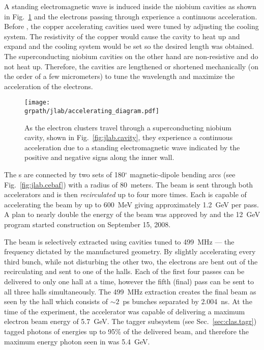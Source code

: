 A standing electromagnetic wave is induced inside the niobium cavities as shown in Fig.~\ref{fig:jlab.accel} and the electrons passing through experience a continuous acceleration. Before , the copper accelerating cavities used were tuned by adjusting the cooling system. The resistivity of the copper would cause the cavity to heat up and expand and the cooling system would be set so the desired length was obtained. The superconducting niobium cavities on the other hand are non-resistive and do not heat up. Therefore, the cavities are lengthened or shortened mechanically (on the order of a few micrometers) to tune the wavelength and maximize the acceleration of the electrons.

\begin{figure}\begin{center}
\texttt{[image: \\grpath/jlab/accelerating\_diagram.pdf]}
\caption[Accelerating Cavity Diagram]{\label{fig:jlab.accel}As the electron clusters travel through a superconducting niobium cavity, shown in Fig.~\ref{fig:jlab.cavity}, they experience a continuous acceleration due to a standing electromagnetic wave indicated by the positive and negative signs along the inner wall.}
\end{center}\end{figure}

The s are connected by two sets of 180$^\circ$ magnetic-dipole bending arcs (see Fig.~\ref{fig:jlab.cebaf}) with a radius of 80~meters. The beam is sent through both accelerators and is then \emph{recirculated} up to four more times. Each  is capable of accelerating the beam by up to 600~MeV giving approximately 1.2~GeV per pass. A plan to nearly double the energy of the beam was approved by \label{abbr:doe} and the 12~GeV program started construction on September 15, 2008\cite{jlab.news.cd3, jlab.12gev.starts}.

The beam is selectively extracted using  cavities tuned to 499~MHz --- the frequency dictated by the manufactured geometry. By slightly accelerating every third bunch, while not disturbing the other two, the electrons are bent out of the recirculating  and sent to one of the halls. Each of the first four passes can be delivered to only one hall at a time, however the fifth (final) pass can be sent to all three halls simultaneously. The 499~MHz extraction creates the final beam as seen by the hall which consists of $\sim2$~ps bunches separated by 2.004~ns. At the time of the  experiment, the accelerator was capable of delivering a maximum electron beam energy of 5.7~GeV. The tagger subsystem (see Sec.~\ref{sec:clas.tagr}) tagged photons of energies up to 95\% of the delivered beam, and therefore the maximum energy photon seen in  was 5.4~GeV.
